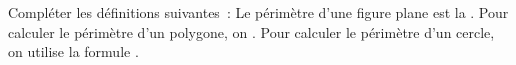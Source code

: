 \documentclass[exercice]{thedocument}%
\begin{document}
%
Compléter les définitions suivantes~:\vskip10pt\noindent
Le périmètre d'une figure plane est la \doted{100pt}.\vskip5pt\noindent
Pour calculer le périmètre d'un polygone, on \doted{100pt}.\vskip5pt\noindent
Pour calculer le périmètre d'un cercle, on utilise la formule \doted{60pt}.\vskip20pt
\end{document}
